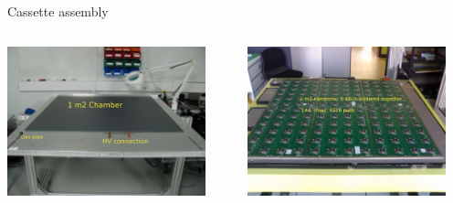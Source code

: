\documentclass[10pt]{beamer}
\begin{document}
\begin{frame}{Cassette assembly}
  \begin{columns}
    \begin{column}{0.5\textwidth}

      \centerline{\includegraphics[width=0.9\textwidth]{jpg/ConstructionRPC}}
    \end{column}
    \pause
    \begin{column}{0.5\textwidth}


      \centerline{\includegraphics[width=0.9\textwidth]{jpg/1m2HR2}}
    \end{column}
  \end{columns}
  \begin{columns}
    \pause

    \begin{column}{0.5\textwidth}


\end{column}
\end{columns}
\end{frame}
\end{document}
